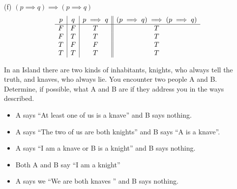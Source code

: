 \documentclass[addpoints]{exam}
\newenvironment{problem}[2][Problem]{\begin{trivlist}
    \item[\hskip \labelsep {\bfseries #1}\hskip \labelsep {\bfseries #2.}]}{\end{trivlist}}
\begin{document}
\begin{questions}
\begin{solution}
        (f) $ (p \implies q) \implies (p \implies q) $
        \[ 
        \begin{array}{c | c | c || c}
            p & q & p \implies q & (p \implies q) \implies (p \implies q) \\ 
            \hline
            F & F & T & T     \\ 
            F & T & T & T     \\ 
            T & F & F & T     \\ 
            T & T & T & T
        \end{array}
        \]

    \end{solution}
\end{questions}

\pagebreak
\begin{problem}{4}
In an Island there are two kinds of inhabitants, knights, who always tell the truth, and knaves, who always lie. You encounter two people
A and B. Determine, if possible, what A and B are if they address you in the ways described.
\begin{itemize}
    \item[(a)] A says ``At least one of us is a knave'' and B says nothing.
    \item[(b)] A says ``The two of us are both knights'' and B says ``A is a knave''.
    \item[(c)] A says ``I am a knave or B is a knight'' and B says nothing.
    \item[(d)] Both A and B say ``I am a knight''
    \item[(e)] A says we ``We are both knaves '' and B says nothing.
\end{itemize}
\end{problem}
\end{document}
